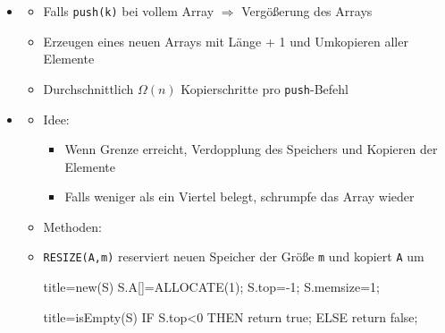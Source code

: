 \documentclass[
    12pt,
    a4paper,
    ngerman,
    color=3b,%
    marginpar=false,
    colorback=false,
    leqno,
]{tudaexercise}
\begin{document}
\begin{itemize}
    \item {}
          \begin{itemize}
              \item Falls \texttt{push(k)} bei vollem Array $\Rightarrow$ Vergößerung des Arrays
              \item Erzeugen eines neuen Arrays mit Länge + 1 und Umkopieren aller Elemente
              \item Durchschnittlich $\Omega(n)$ Kopierschritte pro \texttt{push}-Befehl
          \end{itemize}
          \clearpage
    \item {}
          \begin{itemize}
              \item Idee:
                    \begin{itemize}
                        \item Wenn Grenze erreicht, Verdopplung des Speichers und Kopieren der Elemente
                        \item Falls weniger als ein Viertel belegt, schrumpfe das Array wieder
                    \end{itemize}
              \item Methoden:
              \item[] \texttt{RESIZE(A,m)} reserviert neuen Speicher der Grö\ss e \texttt{m} und kopiert \texttt{A} um\\
                    \begin{minipage}[t]{.5\textwidth}
                        \begin{codeBlock}[autogobble]{title=new(S)}
                            S.A[]=ALLOCATE(1);
                            S.top=-1;
                            S.memsize=1;
                        \end{codeBlock}
                    \end{minipage}
                    \begin{minipage}[t]{.4\textwidth}
                        \begin{codeBlock}[autogobble]{title=isEmpty(S)}
                            IF S.top<0 THEN
                                return true;
                            ELSE
                                return false;
                        \end{codeBlock}
                    \end{minipage}
                    \\

\end{itemize}
\end{itemize}
\end{document}
